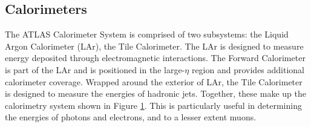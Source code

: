 \subsection{Calorimeters}

\begin{figure}[h!]
\captionsetup[subfigure]{position=b}
\centering
{}
\caption{}
\label{fig:atlasCalo}
\end{figure}

The ATLAS Calorimeter System is comprised of two subsystems: the Liquid Argon Calorimeter (LAr), the Tile Calorimeter.
The LAr is designed to measure energy deposited through electromagnetic interactions.
The Forward Calorimeter is part of the LAr and is positioned in the large-$\eta$ region and provides additional calorimeter coverage.
Wrapped around the exterior of LAr, the Tile Calorimeter is designed to measure the energies of hadronic jets.
Together, these make up the calorimetry system shown in Figure \ref{fig:atlasCalo}.
This is particularly useful in determining the energies of photons and electrons, and to a lesser extent muons.

